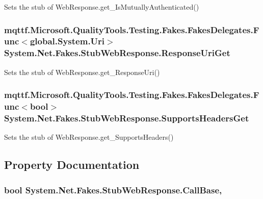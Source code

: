 Sets the stub of Web\-Response.\-get\-\_\-\-Is\-Mutually\-Authenticated()

\hypertarget{class_system_1_1_net_1_1_fakes_1_1_stub_web_response_a047437e344a366ee5df97702b9b9fce2}{
\subsubsection[{Response\-Uri\-Get}]{\setlength{\rightskip}{0pt plus 5cm}mqttf.\-Microsoft.\-Quality\-Tools.\-Testing.\-Fakes.\-Fakes\-Delegates.\-Func$<$global.\-System.\-Uri$>$ System.\-Net.\-Fakes.\-Stub\-Web\-Response.\-Response\-Uri\-Get}}\label{class_system_1_1_net_1_1_fakes_1_1_stub_web_response_a047437e344a366ee5df97702b9b9fce2}


Sets the stub of Web\-Response.\-get\-\_\-\-Response\-Uri()

\hypertarget{class_system_1_1_net_1_1_fakes_1_1_stub_web_response_a1b37ffcffaa3f112b86449b65c2a6f10}{
\subsubsection[{Supports\-Headers\-Get}]{\setlength{\rightskip}{0pt plus 5cm}mqttf.\-Microsoft.\-Quality\-Tools.\-Testing.\-Fakes.\-Fakes\-Delegates.\-Func$<$bool$>$ System.\-Net.\-Fakes.\-Stub\-Web\-Response.\-Supports\-Headers\-Get}}\label{class_system_1_1_net_1_1_fakes_1_1_stub_web_response_a1b37ffcffaa3f112b86449b65c2a6f10}


Sets the stub of Web\-Response.\-get\-\_\-\-Supports\-Headers()



\subsection{Property Documentation}
\hypertarget{class_system_1_1_net_1_1_fakes_1_1_stub_web_response_a8682bb42b2ed15b8f1678f1edc13713f}{
\subsubsection[{Call\-Base}]{\setlength{\rightskip}{0pt plus 5cm}bool System.\-Net.\-Fakes.\-Stub\-Web\-Response.\-Call\-Base\hspace{0.3cm}{\ttfamily [get]}, {\ttfamily [set]}}}\label{class_system_1_1_net_1_1_fakes_1_1_stub_web_response_a8682bb42b2ed15b8f1678f1edc13713f}


